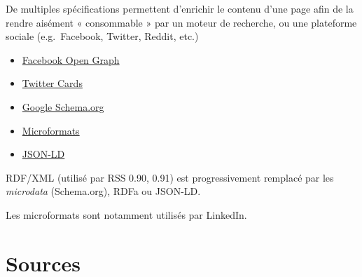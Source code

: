 De multiples spécifications permettent d'enrichir le contenu d'une page
afin de la rendre aisément « consommable » par un moteur de recherche,
ou une plateforme sociale (e.g.~Facebook, Twitter, Reddit, etc.)

\begin{itemize}
\tightlist
\item
  \href{http://ogp.me/}{Facebook Open Graph}
\item
  \href{https://dev.twitter.com/cards/overview}{Twitter Cards}
\item
  \href{http://schema.org/}{Google Schema.org}
\item
  \href{http://microformats.org/}{Microformats}
\item
  \href{http://json-ld.org/}{JSON-LD}
\end{itemize}

RDF/XML (utilisé par RSS 0.90, 0.91) est progressivement remplacé par
les \emph{microdata} (Schema.org), RDFa ou JSON-LD.

Les microformats sont notamment utilisés par LinkedIn.

\begin{otherlanguage}{english}

\end{otherlanguage}

\begin{otherlanguage}{english}

\end{otherlanguage}

\begin{otherlanguage}{english}

\end{otherlanguage}

\hypertarget{sources}{%
\section{Sources}\label{sources}}
